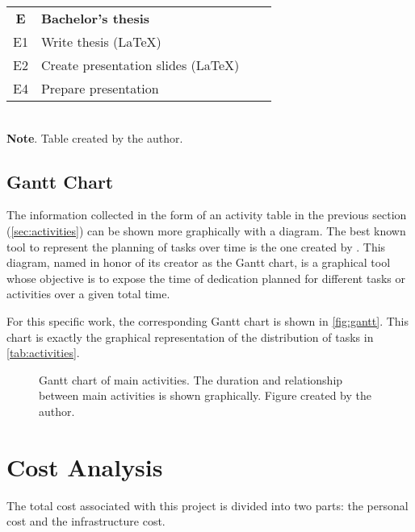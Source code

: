 \begin{table}[p]
\begin{tabular}{cp{}cc}
    \rowcolor{rowColor}
    \textbf{E} & \textbf{Bachelor's thesis} &  &  \\
    \rowcolor{rowColor}
    E1 & Write thesis (\LaTeX) &  &  \\
    \rowcolor{rowColor}
    E2 & Create presentation slides (\LaTeX) &  &  \\
    \rowcolor{rowColor} E4 & Prepare presentation &  &  \\
    \bottomrule
  \end{tabular} \\[1.25ex]
  {\small\textbf{Note}. Table created by the author.}
\end{table}


\subsection{Gantt Chart}\label{sec:gantt}

The information collected in the form of an activity table in the previous
section (\vref{sec:activities}) can be shown more graphically with a
diagram. The best known tool to represent the planning of tasks over time is
the one created by . This
diagram, named in honor of its creator as the Gantt chart, is a graphical tool
whose objective is to expose the time of dedication planned for different tasks
or activities over a given total time.

For this specific work, the corresponding Gantt chart is shown in
\vref{fig:gantt}. This chart is exactly the graphical representation of the
distribution of tasks in \vref{tab:activities}.

\begin{figure}[ht]
  \centering
  
  \vspace{-.6cm} %
  \caption[Gantt chart of main activities]{Gantt chart of main activities. The
    duration and relationship between main activities is shown
    graphically. Figure created by the author.}\label{fig:gantt}
\end{figure}



\section{Cost Analysis} \label{sec:cost}

The total cost associated with this project is divided into two parts: the
personal cost and the infrastructure cost.

